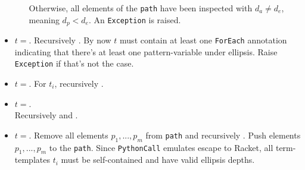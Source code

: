 \begin{itemize}
\begin{itemize}
\begin{enumerate}
		\end{enumerate}
	  Otherwise, all elements of the \texttt{path} have been inspected with $d_a \neq d_e$, meaning $d_p < d_e$. An \texttt{Exception} is raised.
	\end{itemize}
\item
$t=$\space \TermRepeat. Recursively . By now $t$ must contain at least one \texttt{ForEach} annotation indicating that there's at least one pattern-variable under ellipsis. Raise \texttt{Exception} if that's not the case.
\item
$t=$\space \TermSequence. For $t_i$, recursively .
\item
$t=$\space \TermInHole. \\ Recursively  and .
\item
$t=$\space \PythonCall. Remove all elements $p_1, ..., p_m$ from \texttt{path} and recursively . Push elements $p_1, ..., p_m$ to the \texttt{path}. Since \texttt{PythonCall} emulates escape to Racket, all term-templates $t_i$ must be self-contained and have valid ellipsis depths.
\end{itemize}
